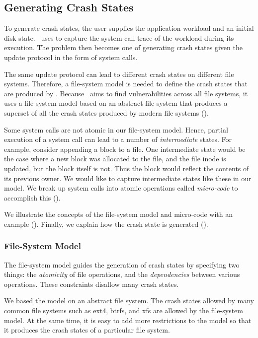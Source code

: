 \subsection{Generating Crash States}
\label{sec-diskstate}
To generate crash states, the user supplies the application workload and an
initial disk state. \toolname\ uses  to capture the system call
trace of the workload during its execution. The problem then becomes one of
generating crash states given the update protocol in the form of system calls.

The same update protocol can lead to different crash states on different file
systems. Therefore, a file-system model is needed to define the crash states
that are produced by \toolname. Because \toolname\ aims to find vulnerabilities
across all file systems, it uses a file-system model based on an abstract file
system that produces a superset of all the crash states produced by modern file
systems (). 

Some system calls are not atomic in our file-system model. Hence, partial
execution of a system call can lead to a number of \textit{intermediate}
states. For example, consider appending a block to a file. One intermediate
state would be the case where a new block was allocated to the file, and the
file inode is updated, but the block itself is not. Thus the block would
reflect the contents of its previous owner. We would like to capture
intermediate states like these in our model. We break up system calls into
atomic operations called \textit{micro-code} to accomplish this
(). 

We illustrate the concepts of the file-system
model and micro-code with an example (). Finally, we explain
how the crash state is generated (). 

%
%

\subsubsection{File-System Model}
\label{sec-model}
The file-system model guides the generation of crash states by specifying two
things: the \textit{atomicity} of file operations, and the
\textit{dependencies} between various operations. These constraints disallow
many crash states.

We based the model on an abstract file system. The crash states allowed by many 
common file systems such as ext4, btrfs, and xfs are allowed by the file-system
model. At the same time, it is easy to add more restrictions to the model so
that it produces the crash states of a particular file system.

